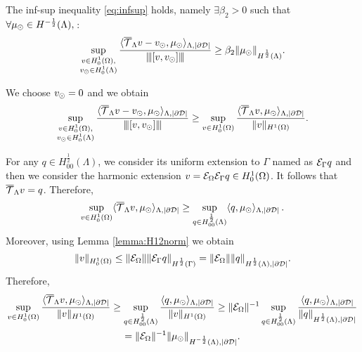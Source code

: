 \begin{lemma}
The inf-sup inequality \eqref{eq:infsup} holds, namely $ \exists \beta_2 >0$ such that $\forall \mu_{\odot} \in H^{-\frac 12}(\Lambda),\,$:
\begin{equation*}
\sup _{\substack{v\in H^1_0(\Omega),\\ v_{\odot} \in H^1_0(\Lambda)}} \frac{ \langle {\overline{\mathcal{T}}_\Lambda} v - v_{\odot}, \mu_{\odot} \rangle_{\Lambda,|\partial\mathcal{D}|}}{{\left\vert\kern-0.25ex\left\vert\kern-0.25ex\left\vert [v,v_{\odot}] \right\vert\kern-0.25ex\right\vert\kern-0.25ex\right\vert}}
\geq \beta_2 \|\mu_{\odot}\|_{H^{\frac 12}(\Lambda)}.
\end{equation*}
\end{lemma} 
We choose $v_{\odot}=0$ and we obtain
\begin{equation*}
\sup _{\substack{v\in H^1_0(\Omega),\\ v_{\odot} \in H^1_0(\Lambda)}} \frac{ \langle {\overline{\mathcal{T}}_\Lambda} v - v_{\odot}, \mu_{\odot} \rangle_{\Lambda,|\partial\mathcal{D}|}}{{\left\vert\kern-0.25ex\left\vert\kern-0.25ex\left\vert [v,v_{\odot}] \right\vert\kern-0.25ex\right\vert\kern-0.25ex\right\vert}}
\geq \sup _{v\in H^1_0(\Omega)} \frac{ \langle {\overline{\mathcal{T}}_\Lambda} v, \mu_{\odot} \rangle_{\Lambda,|\partial\mathcal{D}|}}{\|v\|_{H^1(\Omega)}}. 
\end{equation*}

For any $q \in H^{\frac 12}_{00}(\Lambda)$, we consider its uniform extension to $\Gamma$ named as $\mathcal{E}_\Gamma q$
and then we consider the harmonic extension $v=\mathcal{E}_\Omega \mathcal{E}_\Gamma q\in H^1_0(\Omega)$. It follows that ${\overline{\mathcal{T}}_\Lambda} v=q$. Therefore, 
\begin{equation*}
\sup _{v\in H^1_0(\Omega)}  \langle {\overline{\mathcal{T}}_\Lambda} v, \mu_{\odot} \rangle_{\Lambda,|\partial\mathcal{D}|} \geq\sup_{q \in H^{\frac 12}_{00}(\Lambda)} \langle q, \mu_{\odot}  \rangle_{\Lambda,|\partial\mathcal{D}|}\,.
\end{equation*}
Moreover, using Lemma \ref{lemma:H12norm} we obtain
\begin{equation*}
\|v\|_{H^1_0(\Omega)}\leq \|\mathcal{E}_\Omega\| \|\mathcal{E}_\Gamma q\|_{H^{\frac 12}(\Gamma)}  = \|\mathcal{E}_\Omega\| \|q\|_{H^{\frac 12}(\Lambda),|\partial\mathcal{D}|}.
\end{equation*}
 Therefore,
\begin{multline*}
\sup _{v\in H^1_0(\Omega)} \frac{ \langle {\overline{\mathcal{T}}_\Lambda} v, \mu_{\odot} \rangle_{\Lambda,|\partial\mathcal{D}|}}{\|v\|_{H^1(\Omega)}}
\geq \sup _{q\in H^{\frac 12}_{00}(\Lambda)} \frac{ \langle q, \mu_{\odot} \rangle_{\Lambda,|\partial\mathcal{D}|}}{\|v\|_{H^1(\Omega)}}
\geq \|\mathcal{E}_\Omega\|^{-1} \sup _{q\in H^{\frac 12}_{00}(\Lambda)} \frac{ \langle q, \mu_{\odot} \rangle_{\Lambda,|\partial\mathcal{D}|}}{\|q\|_{H^{\frac 12}(\Lambda),|\partial\mathcal{D}|}} 
\\= \|\mathcal{E}_\Omega\|^{-1} \|\mu_{\odot}\|_{H^{-\frac 12}(\Lambda),|\partial\mathcal{D}|}.
\end{multline*}



